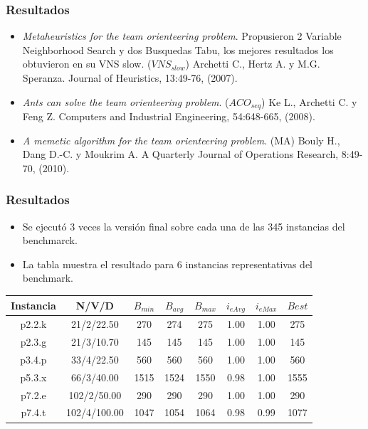 \documentclass{beamer}
\begin{document}

\begin{frame}
\frametitle{Resultados}

\begin{itemize}
	\item \textit{Metaheuristics for the team orienteering problem}. Propusieron 2 Variable Neighborhood Search y dos Busquedas Tabu, los mejores resultados los obtuvieron en su VNS slow. ($VNS_{slow}$) Archetti C., Hertz A. y M.G. Speranza. Journal of Heuristics, 13:49-76, (2007).
	\pause
	\item \textit{Ants can solve the team orienteering problem}. ($ACO_{seq}$) Ke L., Archetti C. y Feng Z. Computers and Industrial Engineering, 54:648-665, (2008).
	\pause
	\item \textit{A memetic algorithm for the team orienteering problem}. (MA) Bouly H., Dang D.-C. y Moukrim A. A Quarterly Journal of Operations Research, 8:49-70, (2010).
\end{itemize}

\end{frame}


\begin{frame}
\frametitle{Resultados}

\begin{itemize}
    \item Se ejecutó 3 veces la versión final sobre cada una de las 345 instancias del benchmarck.
    \pause
    \item La tabla muestra el resultado para 6 instancias representativas del benchmark.
\end{itemize}

\begin{table}
\begin{center}
\begin{tabular}{ |c|c|c|c|c|c|c|c| } 
\hline
Instancia & N/V/D & $B_{min}$ & $B_{avg}$ & $B_{max}$ & $i_{eAvg}$ & $i_{eMax}$ & $Best$ \\
\hline
p2.2.k & 21/2/22.50 & 270 & 274 & 275 & 1.00 & 1.00 & 275 \\
p2.3.g & 21/3/10.70 & 145 & 145 & 145 & 1.00 & 1.00 & 145 \\
p3.4.p & 33/4/22.50 & 560 & 560 & 560 & 1.00 & 1.00 & 560 \\
p5.3.x & 66/3/40.00 & 1515 & 1524 & 1550 & 0.98 & 1.00 & 1555 \\
p7.2.e & 102/2/50.00 & 290 & 290 & 290 & 1.00 & 1.00 & 290 \\
p7.4.t & 102/4/100.00 & 1047 & 1054 & 1064 & 0.98 & 0.99 & 1077 \\
\hline
\end{tabular}
\end{center}
\label{tab:resultados}
\end{table}

\end{frame}
\end{document}
